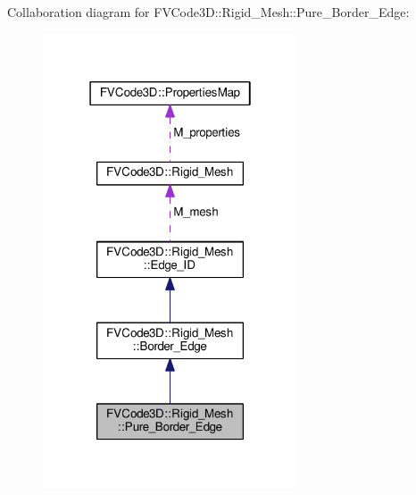Collaboration diagram for F\+V\+Code3D\+:\+:Rigid\+\_\+\+Mesh\+:\+:Pure\+\_\+\+Border\+\_\+\+Edge\+:
\nopagebreak
\begin{figure}[H]
\begin{center}
\leavevmode
\includegraphics[width=214pt]{classFVCode3D_1_1Rigid__Mesh_1_1Pure__Border__Edge__coll__graph}
\end{center}
\end{figure}

